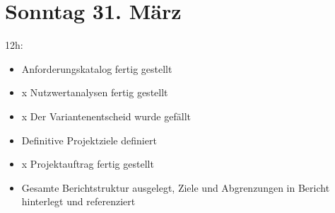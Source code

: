 \section{Sonntag 31. März}\label{sonntag-31.muxe4rz}

12h:

\begin{itemize}
  \tightlist
  \item
        Anforderungskatalog fertig gestellt
  \item x
        Nutzwertanalysen fertig gestellt
  \item x
        Der Variantenentscheid wurde gefällt
  \item
        Definitive Projektziele definiert
  \item x
        Projektauftrag fertig gestellt
  \item
        Gesamte Berichtstruktur ausgelegt, Ziele und Abgrenzungen in Bericht
        hinterlegt und referenziert
\end{itemize}
